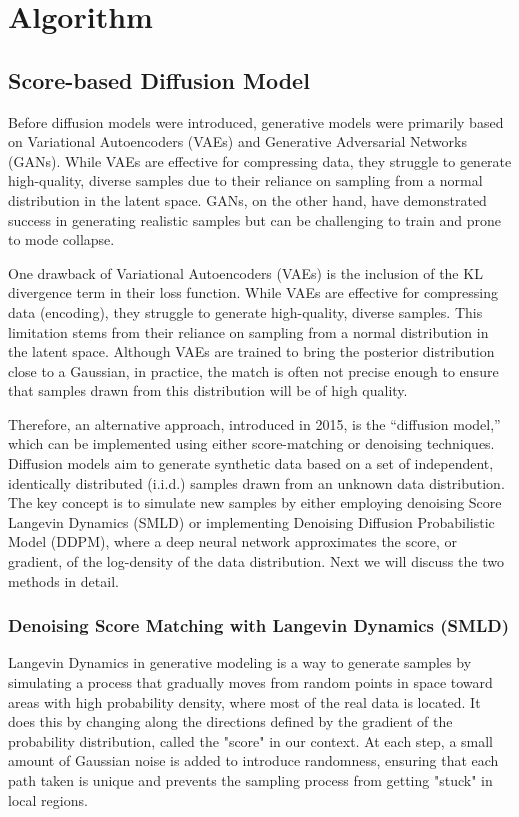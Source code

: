 \chapter{Algorithm}
\section{Score-based Diffusion Model}
Before diffusion models were introduced, generative models were primarily based on Variational Autoencoders (VAEs) and Generative Adversarial Networks (GANs). While VAEs are effective for compressing data, they struggle to generate high-quality, diverse samples due to their reliance on sampling from a normal distribution in the latent space. GANs, on the other hand, have demonstrated success in generating realistic samples but can be challenging to train and prone to mode collapse.

One drawback of Variational Autoencoders (VAEs) is the inclusion of the KL divergence term in their loss function. While VAEs are effective for compressing data (encoding), they struggle to generate high-quality, diverse samples. This limitation stems from their reliance on sampling from a normal distribution in the latent space. Although VAEs are trained to bring the posterior distribution close to a Gaussian, in practice, the match is often not precise enough to ensure that samples drawn from this distribution will be of high quality.

Therefore, an alternative approach, introduced in 2015, is the “diffusion model,” which can be implemented using either score-matching or denoising techniques. Diffusion models aim to generate synthetic data based on a set of independent, identically distributed (i.i.d.) samples drawn from an unknown data distribution. The key concept is to simulate new samples by either employing denoising Score Langevin Dynamics (SMLD) or implementing Denoising Diffusion Probabilistic Model (DDPM), where a deep neural network approximates the score, or gradient, of the log-density of the data distribution. Next we will discuss the two methods in detail.

\subsection{Denoising Score Matching with Langevin Dynamics (SMLD)}
Langevin Dynamics in generative modeling is a way to generate samples by simulating a process that gradually moves from random points in space toward areas with high probability density, where most of the real data is located. It does this by changing along the directions defined by the gradient of the probability distribution, called the "score" in our context. At each step, a small amount of Gaussian noise is added to introduce randomness, ensuring that each path taken is unique and prevents the sampling process from getting "stuck" in local regions.

